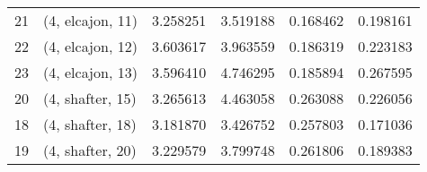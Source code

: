 \begin{tabular}{llrrrr}
21 &  (4, elcajon, 11) &   3.258251 &   3.519188 &   0.168462 &  0.198161 \\
22 &  (4, elcajon, 12) &   3.603617 &   3.963559 &   0.186319 &  0.223183 \\
23 &  (4, elcajon, 13) &   3.596410 &   4.746295 &   0.185894 &  0.267595 \\
20 &  (4, shafter, 15) &   3.265613 &   4.463058 &   0.263088 &  0.226056 \\
18 &  (4, shafter, 18) &   3.181870 &   3.426752 &   0.257803 &  0.171036 \\
19 &  (4, shafter, 20) &   3.229579 &   3.799748 &   0.261806 &  0.189383 \\
\bottomrule
\end{tabular}
